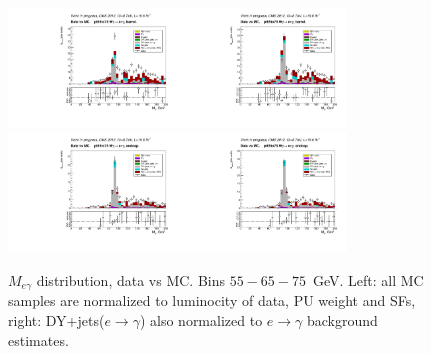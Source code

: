 \begin{figure}[htb]
\begin{center}
    \includegraphics[width=0.40\textwidth]{../figs/figs_v11/ELECTRON_WGamma/PrepareYields/c_TotalDATAvsMC_Barrel__Mpholep1PRELIMINARY_FOR_E_TO_GAMMA_WITH_PSV_CUT_pt65to75_.pdf}\includegraphics[width=0.40\textwidth]{../figs/figs_v11/ELECTRON_WGamma/PrepareYields/c_TotalDATAvsMC_Barrel__Mpholep1PRELIMINARY_FOR_E_TO_GAMMA_WITH_PSV_CUT_pt65to75__etogScale.pdf}\\
    \includegraphics[width=0.40\textwidth]{../figs/figs_v11/ELECTRON_WGamma/PrepareYields/c_TotalDATAvsMC_Endcap__Mpholep1PRELIMINARY_FOR_E_TO_GAMMA_WITH_PSV_CUT_pt65to75_.pdf}\includegraphics[width=0.40\textwidth]{../figs/figs_v11/ELECTRON_WGamma/PrepareYields/c_TotalDATAvsMC_Endcap__Mpholep1PRELIMINARY_FOR_E_TO_GAMMA_WITH_PSV_CUT_pt65to75__etogScale.pdf}\\
   \label{fig:Mpholep1DatavsMC_35to75}
  \caption{$M_{e\gamma}$ distribution, data vs MC. Bins $55-65-75$~GeV. Left: all MC samples are normalized to luminocity of data, PU weight and SFs, right: DY+jets($e\rightarrow\gamma$) also normalized to $e\rightarrow\gamma$ background estimates.}
  \end{center}
\end{figure}

